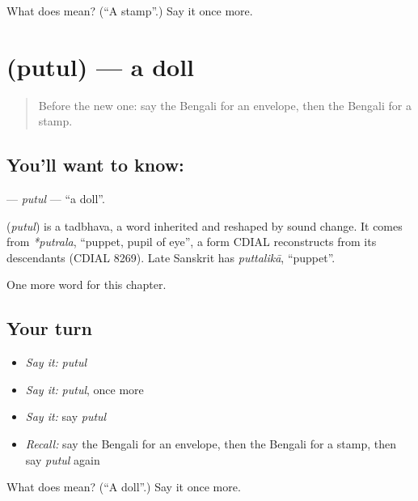 \begin{tcolorbox}[breakable,colback=teal!4,colframe=teal!35!black,title={Before you move on}]
What does  mean? (\textquotedblleft{}A stamp\textquotedblright{}.) Say it once more.
\end{tcolorbox}
\section[\texorpdfstring{\bn{পুতুল} (putul)}{পুতুল (putul)}]{ (putul) — a doll}

\label{lesson:BN-C130-putul}



\begin{quote}
Before the new one: say the Bengali for an envelope, then the Bengali for a stamp.
\end{quote}

\subsection*{You'll want to know: }
\textbf{} — \emph{putul} — \textquotedblleft{}a doll\textquotedblright{}.

\begin{cousinweb}
\textbf{} (\emph{putul}) is a tadbhava, a word inherited and reshaped by sound change. It comes from \emph{*putrala}, \textquotedblleft{}puppet, pupil of eye\textquotedblright{}, a form CDIAL reconstructs from its descendants (CDIAL 8269). Late Sanskrit has \emph{puttalikā}, \textquotedblleft{}puppet\textquotedblright{}.
\end{cousinweb}

\begin{grammarlens}[title={What you've built}]
One more word for this chapter.
\end{grammarlens}

\subsection*{Your turn}
\begin{itemize}
\raggedright
  \item \emph{Say it:} \emph{putul}
  \item \emph{Say it:} \emph{putul}, once more
  \item \emph{Say it:} say \emph{putul}
  \item \emph{Recall:} say the Bengali for an envelope, then the Bengali for a stamp, then say \emph{putul} again
\end{itemize}

\begin{tcolorbox}[breakable,colback=teal!4,colframe=teal!35!black,title={Before you move on}]
What does  mean? (\textquotedblleft{}A doll\textquotedblright{}.) Say it once more.
\end{tcolorbox}
